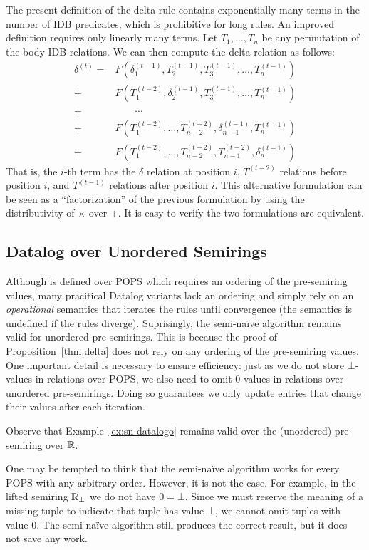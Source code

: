 The present definition of the delta rule contains
 exponentially many terms in the number of IDB predicates, 
 which is prohibitive for long rules.
An improved definition requires only linearly many terms.
Let $T_1, \ldots, T_n$ be any permutation of the body IDB relations. 
We can then compute the delta relation as follows:
%
\begin{align*}
\delta^{(t)} = & F(\delta_1^{(t-1)}, T_2^{(t-1)}, T_3^{(t-1)},\ldots, T_n^{(t-1)}) \\
 + & F(T_1^{(t-2)}, \delta_2^{(t-1)}, T_3^{(t-1)}, \ldots, T_n^{(t-1)}) \\
 + & \hspace{2em} \cdots  \\
 + & F(T_1^{(t-2)}, \ldots, T_{n-2}^{(t-2)}, \delta_{n-1}^{(t-1)}, T_n^{(t-1)}) \\
 + & F(T_1^{(t-2)}, \ldots, T_{n-2}^{(t-2)}, T_{n-1}^{(t-2)}, \delta_n^{(t-1)})
\end{align*}
%
That is, the $i$-th term has the $\delta$ relation at position $i$, 
 $T^{(t-2)}$ relations before position $i$, 
 and $T^{(t-1)}$ relations after position $i$.
This alternative formulation can be seen as a ``factorization'' 
 of the previous formulation by using the distributivity of 
 $\times$ over $+$. 
It is easy to verify the two formulations are equivalent.

\subsection{Datalog over Unordered Semirings}
\label{sec:unordered}
Although \datalogo is defined over POPS which requires an ordering of the pre-semiring values,
many pracitical Datalog variants lack an ordering and simply rely on an {\em operational} semantics
 that iterates the rules until convergence (the semantics is undefined if the rules diverge).
Suprisingly, the semi-na\"ive algorithm remains valid for unordered pre-semirings.
This is because the proof of Proposition~\ref{thm:delta} does not rely on any ordering of the pre-semiring values.
One important detail is necessary to ensure efficiency:
 just as we do not store $\bot$-values in relations over POPS, 
 we also need to omit $0$-values in relations over unordered pre-semirings.
Doing so guarantees we only update entries that change their values after each iteration.
%
\begin{ex}
\label{ex:unordered}
Observe that Example~\ref{ex:sn-datalogo} remains valid over the (unordered) pre-semiring over $\mathbb R$.
\end{ex}
%
One may be tempted to think that the semi-na\"ive algorithm works 
 for every POPS with any arbitrary order.
However, it is not the case.
For example, in the lifted semiring $\mathbb R_\bot$
 we do not have $0 = \bot$.
Since we must reserve the meaning of a missing tuple 
 to indicate that tuple has value $\bot$,
 we cannot omit tuples with value $0$.
The semi-na\"ive algorithm still produces the correct result,
 but it does not save any work.

